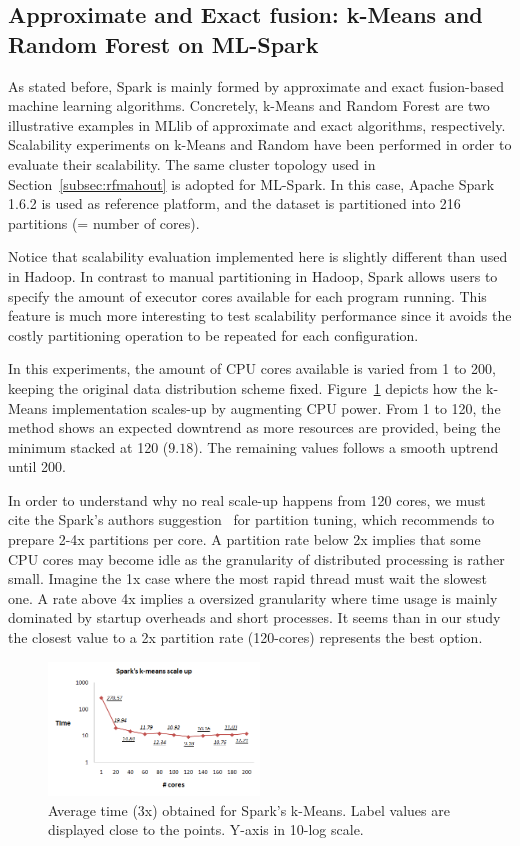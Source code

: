 \documentclass[3p,review]{elsarticle}
\begin{document}
\subsection{Approximate and Exact fusion: k-Means and Random Forest on ML-Spark}
\label{subsec:rfspark}

As stated before, Spark is mainly formed by approximate and exact fusion-based machine learning algorithms. Concretely, k-Means and Random Forest are two illustrative examples in MLlib of approximate and exact algorithms, respectively. Scalability experiments on k-Means and Random have been performed in order to evaluate their scalability. The same cluster topology used in Section~\ref{subsec:rfmahout} is adopted for ML-Spark. In this case, Apache Spark 1.6.2 is used as reference platform, and the dataset is partitioned into 216 partitions (= number of cores).

Notice that scalability evaluation implemented here is slightly different than used in Hadoop. In contrast to manual partitioning in Hadoop, Spark allows users to specify the amount of executor cores available for each program running. This feature is much more interesting to test scalability performance since it avoids the costly partitioning operation to be repeated for each configuration.

In this experiments, the amount of CPU cores available is varied from 1 to 200, keeping the original data distribution scheme fixed. Figure~\ref{fig:kmeans-spark} depicts how the k-Means implementation scales-up by augmenting CPU power. From 1 to 120, the method shows an expected downtrend as more resources are provided, being the minimum stacked at 120 ($9.18$). The remaining values follows a smooth uptrend until 200. 

In order to understand why no real scale-up happens from 120 cores, we must cite the Spark's authors suggestion~\cite{mllibguide} for partition tuning, which recommends to prepare 2-4x partitions per core. A partition rate below 2x implies that some CPU cores may become idle as the granularity of distributed processing is rather small. Imagine the 1x case where the most rapid thread must wait the slowest one. A rate above 4x implies a oversized granularity where time usage is mainly dominated by startup overheads and short processes. It seems than in our study the closest value to a 2x partition rate (120-cores) represents the best option. 

\begin{figure}[htp]
    \centering
    \includegraphics[width=0.5\textwidth]{kmeans-spark}
    \caption{Average time (3x) obtained for Spark's k-Means. Label values are displayed close to the points. Y-axis in 10-log scale.}
    \label{fig:kmeans-spark}
\end{figure}
\end{document}
